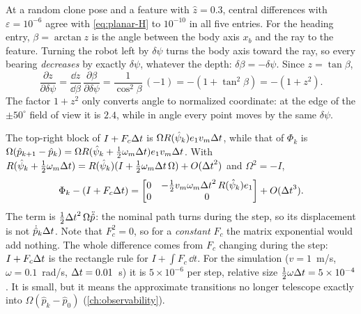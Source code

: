 \begin{solutions}
  \item At a random clone pose and a feature with $\hat z = 0.3$, central differences with $\varepsilon = 10^{-6}$ agree with \eqref{eq:planar-H} to $10^{-10}$ in all five entries. For the
        heading entry, $\beta = \arctan z$ is the angle between the body axis $x_b$ and the ray to the feature. Turning the robot left by $\delta\psi$ turns the body axis
        toward the ray, so every bearing \emph{decreases} by exactly $\delta\psi$, whatever the depth: $\delta\beta = -\delta\psi$. Since $z = \tan\beta$,
        \[
          \frac{\partial z}{\partial\delta\psi} = \frac{\dd z}{\dd\beta}\,\frac{\partial\beta}{\partial\delta\psi} = \frac{1}{\cos^2\beta}\,(-1) = -(1 + \tan^2\beta) = -(1 + z^2).
        \]
        The factor $1 + z^2$ only converts angle to normalized coordinate: at the edge of the $\pm50^\circ$ field of view it is $2.4$, while in angle every point moves
        by the same $\delta\psi$.

  \item The top-right block of $I + F_c{\Delta t}$ is $\Omega R(\hat\psi_k)e_1v_m{\Delta t}$, while that of $\Phi_k$ is $\Omega(\hat p_{k+1} - \hat p_k) = \Omega R(\hat\psi_k + \tfrac12\omega_m{\Delta t})e_1v_m{\Delta t}$. With
        $R(\hat\psi_k + \tfrac12\omega_m{\Delta t}) = R(\hat\psi_k)(I + \tfrac12\omega_m{\Delta t}\,\Omega) + O({\Delta t}^2)$ and $\Omega^2 = -I$,
        \[
          \Phi_k - (I + F_c{\Delta t}) = \begin{bmatrix} 0 & -\tfrac12v_m\omega_m{\Delta t}^2\,R(\hat\psi_k)e_1 \\ 0 & 0\end{bmatrix} + O({\Delta t}^3).
        \]
        The term is $\tfrac12{\Delta t}^2\,\Omega\ddot{\hat p}$: the nominal path turns during the step, so its displacement is not $\dot{\hat p}_k{\Delta t}$. Note that $F_c^2 = 0$, so for a
        \emph{constant} $F_c$ the matrix exponential would add nothing. The whole difference comes from $F_c$ changing during the step: $I + F_c{\Delta t}$ is the rectangle rule for
        $I + \int F_c\,\dd t$. For the simulation ($v = 1$~m/s, $\omega = 0.1$~rad/s, ${\Delta t} = 0.01$~s) it is $5\times10^{-6}$ per step, relative size $\tfrac12\omega{\Delta t} = 5\times10^{-4}$. It is small,
        but it means the approximate transitions no longer telescope exactly into $\Omega(\hat p_k - \hat p_0)$ (\cref{ch:observability}).


\end{solutions}
